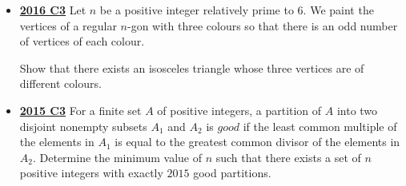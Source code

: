 \documentclass[11pt]{scrartcl}
\begin{document}
\begin{itemize}[leftmargin=*]
Determine the maximum number of moves that Sir Alex could have made, in terms of $n$. 

\newpage

\item \href{https://artofproblemsolving.com/community/c6h1480694p8639260}{\textbf{2016 C3}} Let $n$ be a positive integer relatively prime to $6$. We paint the vertices of a regular $n$-gon with three colours so that there is an odd number of vertices of each colour. 

Show that there exists an isosceles triangle whose three vertices are of different colours. 

\item \href{https://artofproblemsolving.com/community/c6h1268855p6622233}{\textbf{2015 C3}} For a finite set $A$ of positive integers, a partition of $A$ into two disjoint nonempty subsets $A_1$ and $A_2$ is $\textit{good}$ if the least common multiple of the elements in $A_1$ is equal to the greatest common divisor of the elements in $A_2$. Determine the minimum value of $n$ such that there exists a set of $n$ positive integers with exactly $2015$ good partitions. 


\end{itemize}
\end{document}
